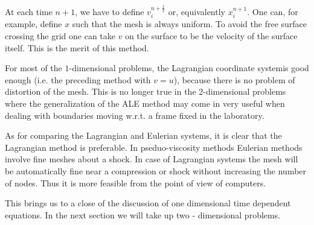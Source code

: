At each time $n+1$, we have to define $v^{n+\frac{1}{2}}_i$ or, equivalently $x^{n+1}_i$. One can, for example, define $x$ such that the mesh is always uniform. To avoid the free surface crossing the grid one can take $v$ on the surface to be the velocity of the surface itself. This is the merit of this method.

For most of the $1$-dimensional problems, the Lagrangian coordinate system\pageoriginale is good enough (i.e. the preceding method with $v=u$), because there is no problem of distortion of the mesh. This is no longer true in the 2-dimensional problems where the generalization of the ALE method may come in very useful when dealing with boundaries moving w.r.t. a frame fixed in the laboratory.

As for comparing the Lagrangian and Eulerian systems, it is clear that the Lagrangian method is preferable. In pseduo-viscosity methods Eulerian methods involve fine meshes about a shock. In case of Lagrangian systems the mesh will be automatically fine near a compression or shock without increasing the number of nodes. Thus it is more feasible from the point of view of computers.

This brings us to a close of the discussion of one dimensional time
dependent equations. In the next section we will take up
two - dimensional problems. 
